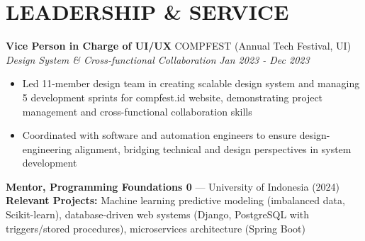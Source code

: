 \documentclass[10pt,a4paper]{article}
\newcommand{\experienceheader}[4]{
    \textbf{#1} \hfill #2 \\
    \textit{#3} \hfill \textit{#4}
}
\begin{document}
\section*{LEADERSHIP \& SERVICE}

\experienceheader{Vice Person in Charge of UI/UX}{COMPFEST (Annual Tech Festival, UI)}{Design System \& Cross-functional Collaboration}{Jan 2023 - Dec 2023}
\begin{itemize}[leftmargin=*, itemsep=2pt, topsep=2pt]
    \item Led 11-member design team in creating scalable design system and managing 5 development sprints for compfest.id website, demonstrating project management and cross-functional collaboration skills
    \item Coordinated with software and automation engineers to ensure design-engineering alignment, bridging technical and design perspectives in system development
\end{itemize}

\vspace{4pt}

\textbf{Mentor, Programming Foundations 0} — University of Indonesia (2024) \\
\textbf{Relevant Projects:} Machine learning predictive modeling (imbalanced data, Scikit-learn), database-driven web systems (Django, PostgreSQL with triggers/stored procedures), microservices architecture (Spring Boot)
\end{document}
